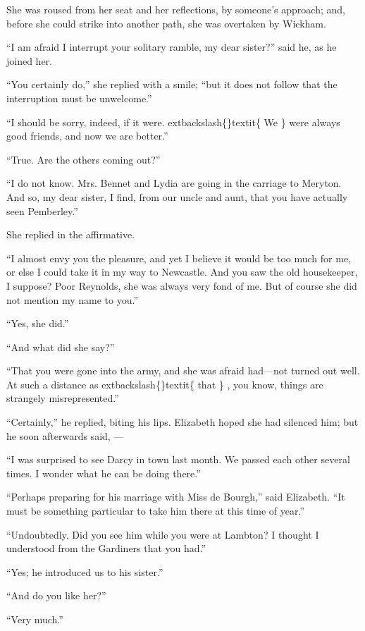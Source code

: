 \documentclass[10pt]{book}
\begin{document}
   She was roused from her seat and her reflections, by someone’s approach;
and, before she could strike into another path, she was overtaken by
Wickham.
  

   “I am afraid I interrupt your solitary ramble, my dear sister?” said he,
as he joined her.
  

   “You certainly do,” she replied with a smile; “but it does not follow
that the interruption must be unwelcome.”
  

   “I should be sorry, indeed, if it were.
   	extbackslash\{\}textit\{
    We
   \}
   were always good friends,
and now we are better.”
  

   “True. Are the others coming out?”
  

   “I do not know. Mrs. Bennet and Lydia are going in the carriage to
Meryton. And so, my dear sister, I find, from our uncle and aunt, that
you have actually seen Pemberley.”
  

   She replied in the affirmative.
  

   “I almost envy you the pleasure, and yet I believe it would be too much
for me, or else I could take it in my way to Newcastle. And you saw the
old housekeeper, I suppose? Poor Reynolds, she was always very fond of
me. But of course she did not mention my name to you.”
  

   “Yes, she did.”
  

   “And what did she say?”
  

   “That you were gone into the army, and she was afraid had—not turned
out well. At such a distance as
   	extbackslash\{\}textit\{
    that
   \}
   , you know, things are strangely
misrepresented.”
  

   “Certainly,” he replied, biting his lips. Elizabeth hoped she had
silenced him; but he soon afterwards said,
   —
  

   “I was surprised to see Darcy in town last month. We passed each other
several times. I wonder what he can be doing there.”
  

   “Perhaps preparing for his marriage with Miss de Bourgh,” said
Elizabeth. “It must be something particular to take him there at this
time of year.”
  

   “Undoubtedly. Did you see him while you were at Lambton? I thought I
understood from the Gardiners that you had.”
  

   “Yes; he introduced us to his sister.”
  

   “And do you like her?”
  

   “Very much.”
  
\end{document}

